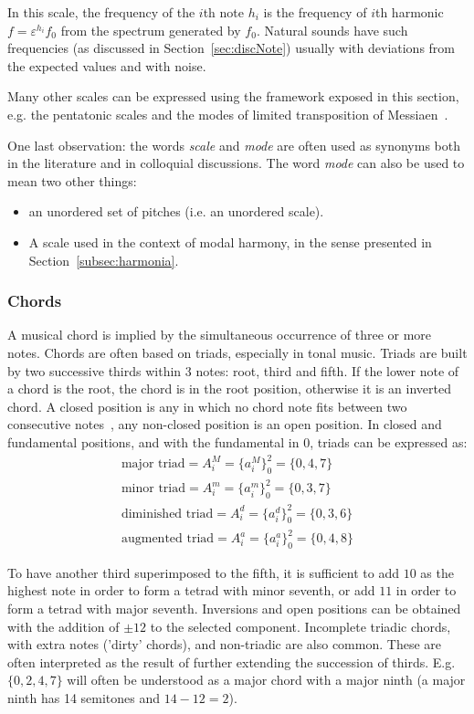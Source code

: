 In this scale, the frequency of the $i$th note $h_i$ is the frequency of $i$th harmonic $f=\varepsilon^{h_i} f_0$ from the spectrum generated by $f_0$. Natural sounds have such frequencies (as discussed in Section~\ref{sec:discNote}) usually with deviations from the expected values and with noise.

Many other scales can be expressed using the framework exposed in this section, e.g. the pentatonic scales and the modes of limited transposition of Messiaen~\cite{Messiaen}.

One last observation: the words \emph{scale} and \emph{mode} are often used as synonyms both in the literature and in colloquial discussions.
The word \emph{mode} can also be used to mean two other things:
\begin{itemize}
	\item an unordered set of pitches (i.e. an unordered scale).
	\item A scale used in the context of modal harmony, in the sense presented in Section~\ref{subsec:harmonia}.
\end{itemize}

\subsubsection{Chords}\label{subsec:acordes}
A musical chord is implied by the simultaneous occurrence of three or more notes. Chords are often based on triads, especially in tonal music. Triads are built by two successive thirds
within 3 notes: root, third and fifth. If the lower note of a chord is the root, the chord is in the root position, otherwise it is an inverted chord. A closed position is any in which no chord note fits between two consecutive
notes~\cite{Lacerda}, any non-closed position is an open position. In closed and fundamental positions,
and with the fundamental in $0$, triads can be expressed as:
\begin{equation}\label{triades}
\begin{split}
\text{major triad} = A_i^M= \{a_i^M\}_0^2=\{0,4,7\} \\ 
\text{minor triad} = A_i^m = \{a_i^m\}_0^2=\{0,3,7\} \\
\text{diminished triad} = A_i^d = \{a_i^d\}_0^2=\{0,3,6\} \\
\text{augmented triad} = A_i^a = \{a_i^a\}_0^2=\{0,4,8\}
\end{split}
\end{equation}

To have another third superimposed to the fifth, it is sufficient to add $10$ as the highest note in order to form a tetrad with minor seventh, or add $11$ in order to form a tetrad with major
seventh. Inversions and open positions can be obtained with the 
addition of $\pm 12$ to the selected component. Incomplete triadic chords, with extra notes ('dirty' chords), and non-triadic
are also common.
These are often interpreted as the result of further extending the succession of thirds.
E.g. $\{0,2,4,7\}$ will often be understood as a major chord with a major ninth (a major ninth has 14 semitones and $14-12 = 2$).


